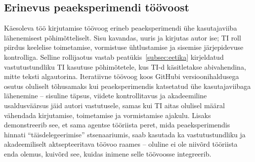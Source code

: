 \subsection{Erinevus peaeksperimendi töövoost} \label{subsec:erinevus}

Käesoleva töö kirjutamise töövoog erineb peaeksperimendi ühe kasutajaviiba lähenemisest põhimõtteliselt. Sisu kavandas, uuris ja kirjutas autor ise; TI roll piirdus keelelise toimetamise, vormistuse ühtlustamise ja sisemise järjepidevuse kontrolliga. Selline rollijaotus vastab peatükis~\ref{subsec:eetika} kirjeldatud vastutustundliku TI kasutuse põhimõtetele, kus TI-d käsitletakse abivahendina, mitte teksti algautorina. Iteratiivne töövoog koos GitHubi versioonihaldusega osutus oluliselt tõhusamaks kui peaeksperimendis katsetatud ühe kasutajaviibaga lähenemine -- sisuline täpsus, viidete kontrollitavus ja akadeemiline usaldusväärsus jäid autori vastutusele, samas kui TI aitas olulisel määral vähendada kirjutamise, toimetamise ja vormistamise ajakulu. Lisaks demonstreerib see, et sama agentse tööriista peret, mida peaeksperimendis hinnati ``täisdelegeerimise'' stsenaariumis, saab kasutada ka vastutustundliku ja akadeemiliselt aktsepteeritava töövoo raames -- oluline ei ole niivõrd tööriista enda olemus, kuivõrd see, kuidas inimene selle töövoosse integreerib.
